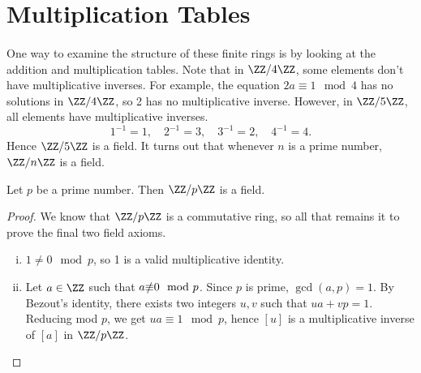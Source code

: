 \documentclass[../abstract_algebra.tex]{subfiles}
\begin{document}
    \section{Multiplication Tables}
        \paragraph{}
        One way to examine the structure of these finite rings is by looking at the addition and multiplication tables.
        Note that in $\ZZ/4\ZZ$, some elements don't have multiplicative inverses.
        For example, the equation $2a\equiv 1\mod4$ has no solutions in $\ZZ/4\ZZ$, so 2 has no multiplicative inverse.
        However, in $\ZZ/5\ZZ$, all elements have multiplicative inverses.
        \begin{equation}
            1^{-1}=1,\quad 2^{-1}=3,\quad 3^{-1}=2,\quad 4^{-1}=4.
        \end{equation}
        Hence $\ZZ/5\ZZ$ is a field.
        It turns out that whenever $n$ is a prime number, $\ZZ/n\ZZ$ is a field.
        \begin{theorem}
            Let $p$ be a prime number. Then $\ZZ/p\ZZ$ is a field.
        \end{theorem}
        \begin{proof}
            We know that $\ZZ/p\ZZ$ is a commutative ring, so all that remains it to prove the final two field axioms.
            \begin{enumerate}[(i)]
                \item $1\neq0\mod p$, so 1 is a valid multiplicative identity.
                \item Let $a\in\ZZ$ such that $a\slashed\equiv0\mod p$. Since $p$ is prime, $\gcd(a,p)=1$.
                By Bezout's identity, there exists two integers $u,v$ such that $ua+vp=1$.
                Reducing mod $p$, we get $ua\equiv 1\mod p$, hence $[u]$ is a multiplicative inverse of $[a]$ in $\ZZ/p\ZZ$. 
            \end{enumerate}
        \end{proof}
\end{document}
